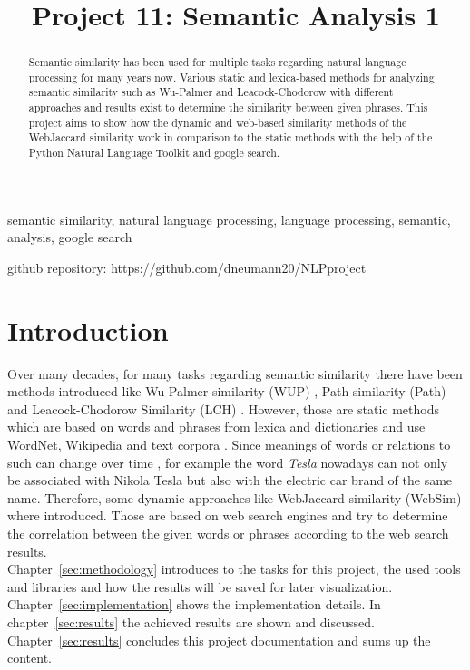 \documentclass[conference]{IEEEtran}
\begin{document}
\title{Project 11: Semantic Analysis 1}

\author{
\and
{}
}

\maketitle
\begin{abstract}
Semantic similarity has been used for multiple tasks regarding natural language processing for many years now. Various static and lexica-based methods for analyzing semantic similarity such as Wu-Palmer and Leacock-Chodorow with different approaches and results exist to determine the similarity between given phrases. This project aims to show how the dynamic and web-based similarity methods of the WebJaccard similarity work in comparison to the static methods with the help of the Python Natural Language Toolkit and google search.
\end{abstract}

\begin{IEEEkeywords}
semantic similarity, natural language processing, language processing, semantic, analysis, google search
\end{IEEEkeywords}

github repository: https://github.com/dneumann20/NLPproject

\section{Introduction}

Over many decades, for many tasks regarding semantic similarity there have been methods introduced like Wu-Palmer similarity (WUP) \cite{wupalmer}, Path similarity (Path) \cite{resnik} and Leacock-Chodorow Similarity (LCH) \cite{lch}. However, those are static methods which are based on words and phrases from lexica and dictionaries and use WordNet, Wikipedia and text corpora \cite{radinsky}. Since meanings of words or relations to such can change over time \cite{websim}, for example the word \textit{Tesla} nowadays can not only be associated with Nikola Tesla but also with the electric car brand of the same name. Therefore, some dynamic approaches like WebJaccard similarity (WebSim) where introduced. Those are based on web search engines and try to determine the correlation between the given words or phrases according to the web search results.\\
Chapter~\ref{sec:methodology} introduces to the tasks for this project, the used tools and libraries and how the results will be saved for later visualization. Chapter~\ref{sec:implementation} shows the implementation details. In chapter~\ref{sec:results} the achieved results are shown and discussed.  Chapter~\ref{sec:results} concludes this project documentation and sums up the content.
\end{document}
